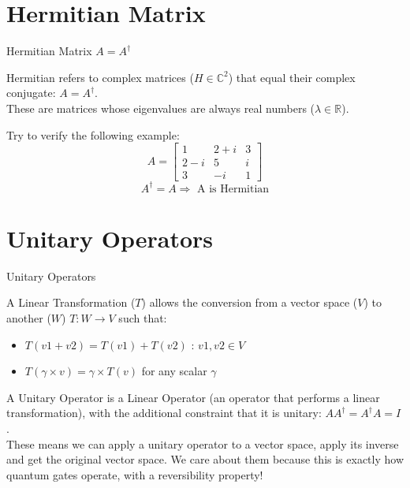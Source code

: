 \documentclass[aspectratio=43]{beamer}
\begin{document}
\section{Hermitian Matrix}
\begin{frame}{Hermitian Matrix $A = A^\dag$}
\begin{card}
    Hermitian refers to complex matrices ($H \in \mathbb{C}^2$) that equal their complex conjugate: $A = A^\dag$.\\
    These are matrices whose eigenvalues are always real numbers ($\lambda \in \mathbb{R}$).
\end{card}
\begin{card}
    Try to verify the following example:
    \begin{equation*}
        A = \begin{bmatrix}1 & 2+i & 3\\2-i & 5 & i\\3 & -i & 1\end{bmatrix}
    \end{equation*}
    \begin{equation*}
    A^\dag = A \Rightarrow\text{ A is Hermitian}
    \end{equation*}
\end{card}
\pagenumber
\end{frame}

\section{Unitary Operators}
\begin{frame}{Unitary Operators}
    \begin{card}
        A Linear Transformation ($T$) allows the conversion from a vector space ($V$) to another ($W$) $T : W \rightarrow V$ such that:
        \begin{itemize}
            \item $T(v1+v2)=T(v1)+T(v2)$ : $v1, v2 \in V$
            \item $T(\gamma \times v)=\gamma \times T(v)$ for any scalar $\gamma$
        \end{itemize}
    \end{card}
    
    \begin{cardTiny}
        A Unitary Operator is a Linear Operator (an operator that performs a linear transformation), with the additional constraint that it is unitary: $AA^\dag=A^\dag A = I$.\\
        These means we can apply a unitary operator to a vector space, apply its inverse and get the original vector space. We care about them because this is exactly how quantum gates operate, with a reversibility property!
    \end{cardTiny}
\pagenumber
\end{frame}
\end{document}
